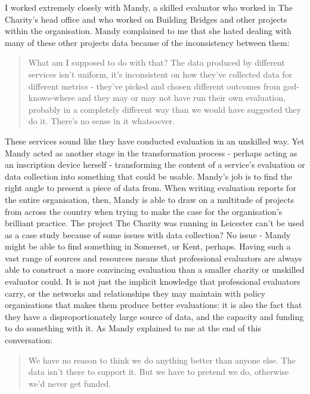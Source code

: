 I worked extremely closely with Mandy, a skilled evaluator who worked in The Charity's head office and who worked on Building Bridges and other projects within the organisation. Mandy complained to me that she hated dealing with many of these other projects data because of the inconsistency between them:
\begin{quote}
What am I supposed to do with that? The data produced by different services isn't uniform, it's inconsistent on how they've collected data for different metrics - they've picked and chosen different outcomes from god-knows-where and they may or may not have run their own evaluation, probably in a completely different way than we would have suggested they do it. There's no sense in it whatsoever.
\end{quote}
These services sound like they have conducted evaluation in an unskilled way. Yet Mandy acted as another stage in the transformation process - perhaps acting as an inscription device herself - transforming the content of a service's evaluation or data collection into something that could be usable. Mandy's job is to find the right angle to present a piece of data from. When writing evaluation reports for the entire organisation, then, Mandy is able to draw on a multitude of projects from across the country when trying to make the case for the organisation's brilliant practice. The project The Charity was running in Leicester can't be used as a case study because of some issues with data collection? No issue - Mandy might be able to find something in Somerset, or Kent, perhaps.  Having such a vast range of sources and resources means that professional evaluators are always able to construct a more convincing evaluation than a smaller charity or unskilled evaluator could. It is not just the implicit knowledge that professional evaluators carry, or the networks and relationships they may maintain with policy organisations that makes them produce better evaluations: it is also the fact that they have a disproportionately large source of data, and the capacity and funding to do something with it. As Mandy explained to me at the end of this conversation:
\begin{quote}
We have no reason to think we do anything better than anyone else. The data isn't there to support it. But we have to pretend we do, otherwise we'd never get funded.
\end{quote}
